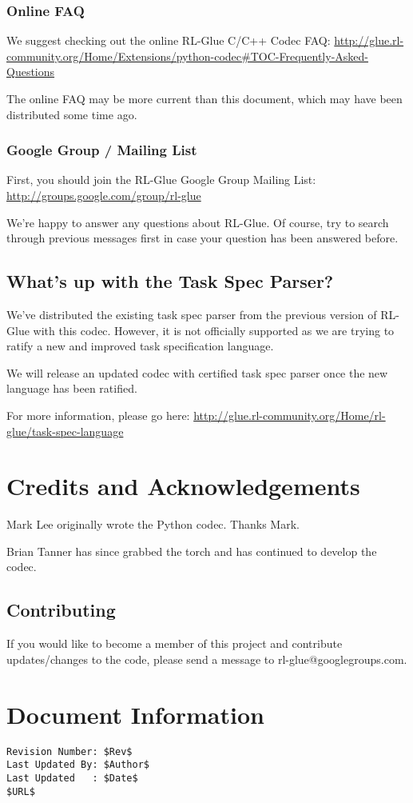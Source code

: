 \documentclass[11pt]{article}
\begin{document}
\subsubsection{Online FAQ}
We suggest checking out the online RL-Glue C/C++ Codec FAQ:\newline
\url{http://glue.rl-community.org/Home/Extensions/python-codec#TOC-Frequently-Asked-Questions}

The online FAQ may be more current than this document, which may have been distributed some time ago.

\subsubsection{Google Group / Mailing List}
First, you should join the RL-Glue Google Group Mailing List:\newline
\url{http://groups.google.com/group/rl-glue}

We're happy to answer any questions about RL-Glue.  Of course, try to search through previous messages first in case your question has been answered before.


\subsection{What's up with the Task Spec Parser?}
We've distributed the existing task spec parser from the previous version of RL-Glue with this codec. 
However, it is not officially supported as we are trying to ratify a new and improved task 
specification language.

We will release an updated codec with certified task spec parser once the new language has been 
ratified.

For more information, please go here:\newline
\url{http://glue.rl-community.org/Home/rl-glue/task-spec-language}

\section{Credits and Acknowledgements}
Mark Lee originally wrote the Python codec.  Thanks Mark.

Brian Tanner has since grabbed the torch and has continued to develop the codec.

\subsection{Contributing}
If you would like to become a member of this project and contribute updates/changes to the code, please send a message to rl-glue@googlegroups.com.


\section*{Document Information}
\begin{verbatim}
Revision Number: $Rev$
Last Updated By: $Author$
Last Updated   : $Date$
$URL$
\end{verbatim}
\end{document}
